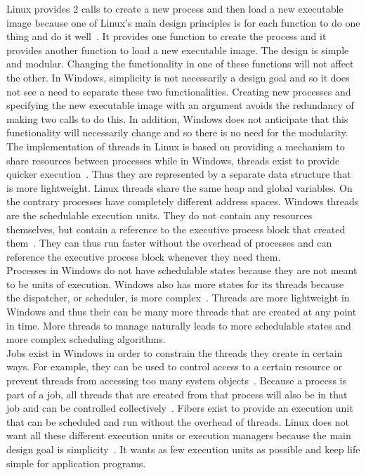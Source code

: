 \documentclass[letterpaper,10pt,titlepage]{article}
\begin{document}
\linebreak
Linux provides 2 calls to create a new process and then load a new executable 
image because one of Linux's main design principles is for each function to 
do one thing and do it well~\cite{tm10}. It provides one function to create the process
and it provides another function to load a new executable image. The design 
is simple and modular. Changing the functionality in one of these functions
will not affect the other. In Windows, simplicity is not necessarily a 
design goal and so it does not see a need to separate these two 
functionalities. Creating new processes and specifying the new 
executable image with an argument avoids the redundancy of making two calls
to do this. In addition, Windows does not anticipate that this 
functionality will necessarily change and so there is no need for the 
modularity.
\\
\linebreak
The implementation of threads in Linux is based on providing a mechanism to 
share resources between processes while in Windows, threads exist to provide
quicker execution~\cite{tm11}. Thus they are represented by a separate data structure that 
is more lightweight. Linux threads share the same heap and global variables.
On the contrary processes have completely different address spaces. Windows
threads are the schedulable execution units. They do not contain any 
resources themselves, but contain a reference to the executive process block
that created them~\cite{rsw6}. They can thus run faster without the overhead of processes
and can reference the executive process block whenever they need them. 
\\
\linebreak
Processes in Windows do not have schedulable states because they are not 
meant to be units of execution. Windows also has more states for its threads
because the dispatcher, or scheduler, is more complex~\cite{rsw6}. Threads are more 
lightweight in Windows and thus their can be many more threads that are 
created at any point in time. More threads to manage naturally leads to
more schedulable states and more complex scheduling algorithms. 
\\
\linebreak
Jobs exist in Windows in order to constrain the threads they create in 
certain ways. For example, they can be used to control access to a certain
resource or prevent threads from accessing too many system objects~\cite{tm11}. Because
a process is part of a job, all threads that are created from that process
will also be in that job and can be controlled collectively~\cite{tm11}. Fibers exist
to provide an execution unit that can be scheduled and run without the
overhead of threads. Linux does not want all these different execution
units or execution managers because the main design goal is simplicity~\cite{tm10}. 
It wants as few execution units as possible and keep life simple for 
application programs.
\end{document}
